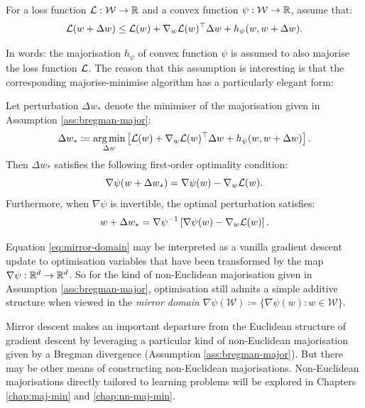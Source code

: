 \begin{refsection}
\begin{assumption}\label{ass:bregman-major} For a loss function $\mathcal{L}: \mathcal{W} \to \mathbb{R}$ and a convex function $\psi:\mathcal{W} \to \mathbb{R}$, assume that:
\begin{equation}
    \mathcal{L}(w+\Delta w) \leq \mathcal{L}(w) + \nabla_w \mathcal{L}(w)^\top \Delta w + h_\psi(w,w+\Delta w).
\end{equation}
\end{assumption}
In words: the majorisation $h_\psi$ of convex function $\psi$ is assumed to also majorise the loss function $\mathcal{L}$. The reason that this assumption is interesting is that the corresponding majorise-minimise algorithm has a particularly elegant form:

\begin{proposition} Let perturbation $\Delta w_*$ denote the minimiser of the majorisation given in Assumption \ref{ass:bregman-major}:
\begin{equation}
    \Delta w_* \coloneqq \operatorname*{arg\,min}_{\Delta w} \left[\mathcal{L}(w) + \nabla_w \mathcal{L}(w)^\top \Delta w + h_\psi(w,w+\Delta w) \right].
\end{equation}
Then $\Delta w_*$ satisfies the following first-order optimality condition:
\begin{equation}\label{eq:mirror-domain}
    \nabla \psi(w+\Delta w_*) = \nabla \psi(w) - \nabla_w\mathcal{L}(w).
\end{equation}
Furthermore, when $\nabla \psi$ is invertible, the optimal perturbation satisfies:
\begin{equation}\label{eq:mirror-back}
    w+\Delta w_* = \nabla \psi^{-1}\left[\nabla \psi(w) - \nabla_w\mathcal{L}(w)\right].
\end{equation}
\end{proposition}

Equation \ref{eq:mirror-domain} may be interpreted as a vanilla gradient descent update to optimisation variables that have been transformed by the map $\nabla\psi:\mathbb{R}^d\to\mathbb{R}^d$. So for the kind of non-Euclidean majorisation given in Assumption \ref{ass:bregman-major}, optimisation still admits a simple additive structure when viewed in the \textit{mirror domain} $\nabla \psi (\mathcal{W}) \coloneqq \{ \nabla \psi (w) : w\in\mathcal{W}\}$.

Mirror descent makes an important departure from the Euclidean structure of gradient descent by leveraging a particular kind of non-Euclidean majorisation given by a Bregman divergence (Assumption \ref{ass:bregman-major}). But there may be other means of constructing non-Euclidean majorisations. Non-Euclidean majorisations directly tailored to learning problems will be explored in Chapters \ref{chap:maj-min} and \ref{chap:nn-maj-min}.


\end{refsection}
